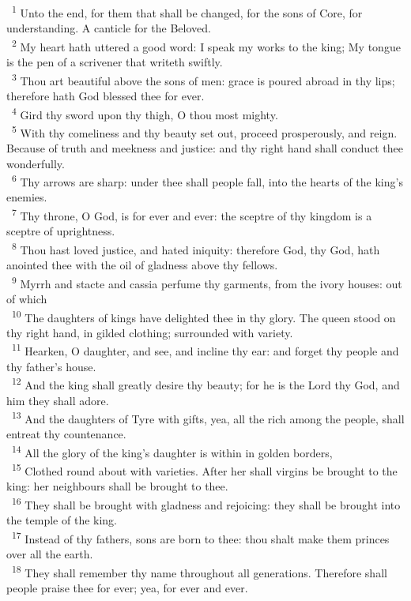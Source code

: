 \documentclass[a5paper,12pt]{article}
\begin{document}
\begin{multicols*}{2}
~\textsuperscript{1} Unto the end, for them that shall be changed, for the sons of Core, for understanding. A canticle for the Beloved.\\
~\textsuperscript{2} My heart hath uttered a good word: I speak my works to the king; My tongue is the pen of a scrivener that writeth swiftly.\\
~\textsuperscript{3} Thou art beautiful above the sons of men: grace is poured abroad in thy lips; therefore hath God blessed thee for ever.\\
~\textsuperscript{4} Gird thy sword upon thy thigh, O thou most mighty.\\
~\textsuperscript{5} With thy comeliness and thy beauty set out, proceed prosperously, and reign. Because of truth and meekness and justice: and thy right hand shall conduct thee wonderfully.\\
~\textsuperscript{6} Thy arrows are sharp: under thee shall people fall, into the hearts of the king's enemies.\\
~\textsuperscript{7} Thy throne, O God, is for ever and ever: the sceptre of thy kingdom is a sceptre of uprightness.\\
~\textsuperscript{8} Thou hast loved justice, and hated iniquity: therefore God, thy God, hath anointed thee with the oil of gladness above thy fellows.\\
~\textsuperscript{9} Myrrh and stacte and cassia perfume thy garments, from the ivory houses: out of which\\
~\textsuperscript{10} The daughters of kings have delighted thee in thy glory. The queen stood on thy right hand, in gilded clothing; surrounded with variety.\\
~\textsuperscript{11} Hearken, O daughter, and see, and incline thy ear: and forget thy people and thy father's house.\\
~\textsuperscript{12} And the king shall greatly desire thy beauty; for he is the Lord thy God, and him they shall adore.\\
~\textsuperscript{13} And the daughters of Tyre with gifts, yea, all the rich among the people, shall entreat thy countenance.\\
~\textsuperscript{14} All the glory of the king's daughter is within in golden borders,\\
~\textsuperscript{15} Clothed round about with varieties. After her shall virgins be brought to the king: her neighbours shall be brought to thee.\\
~\textsuperscript{16} They shall be brought with gladness and rejoicing: they shall be brought into the temple of the king.\\
~\textsuperscript{17} Instead of thy fathers, sons are born to thee: thou shalt make them princes over all the earth.\\
~\textsuperscript{18} They shall remember thy name throughout all generations. Therefore shall people praise thee for ever; yea, for ever and ever.\\


\end{multicols*}
\end{document}
